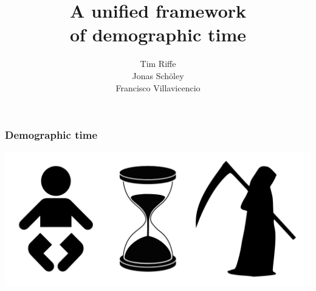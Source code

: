 \documentclass[20pt]{beamer}
\title{A unified framework\\ of demographic time}
\subtitle{Tim Riffe \\ Jonas Sch{\"o}ley \\ Francisco Villavicencio}		%
\begin{document}

\begin{frame}
	\titlepage
\end{frame}
\begin{frame}
\frametitle{Demographic time}
\includegraphics{Figures/DemoTime.pdf}
\end{frame}
\end{document}
